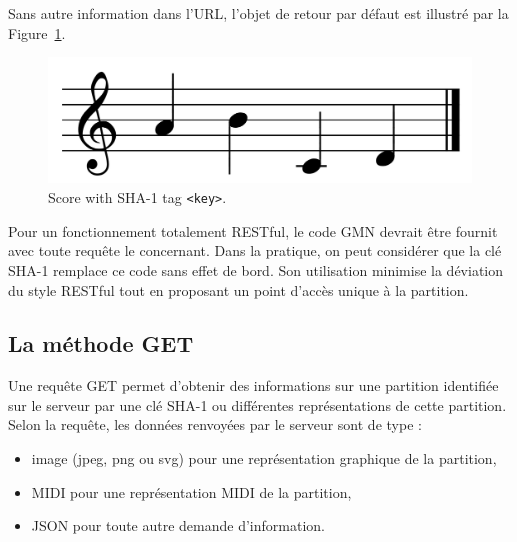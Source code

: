 \documentclass{article}
\begin{document}
Sans autre information dans l'URL, l'objet de retour par défaut est illustré par la Figure~\ref{fig:figure1}.
\begin{figure}[h]
  \centering
    \includegraphics[width=0.65\columnwidth]{figure1}
  \cprotect\caption{\label{fig:figure1}Score with SHA-1 tag \verb=<key>=.}
\end{figure}

Pour un fonctionnement totalement RESTful, le code GMN devrait être fournit avec toute requête le concernant. Dans la pratique, on peut considérer que la clé SHA-1 remplace ce code sans effet de bord. Son utilisation minimise la déviation du style RESTful tout en proposant un point d'accès unique à la partition. 

\subsection{La méthode GET}\label{subsection:get}
Une requête GET permet d'obtenir des informations sur une partition identifiée sur le serveur par une clé SHA-1 ou différentes représentations de cette partition. 
Selon la requête, les données renvoyées par le serveur sont de type :
\begin{itemize}
\item image (jpeg, png ou svg) pour une représentation graphique de la partition,
\item MIDI pour une représentation MIDI de la partition, 
\item JSON pour toute autre demande d'information.
\end{itemize}

\end{document}
